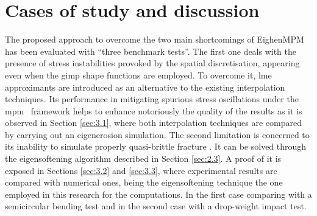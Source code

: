 \documentclass[preprint,12pt,a4paper]{elsarticle}
\begin{document}
\section{Cases of study and discussion}
\label{sec:3}

The proposed approach to overcome the two main shortcomings of
EighenMPM \cite{Zhang_EE_2020} has been evaluated with ``three
benchmark tests''.
The first one deals with the presence of stress
instabilities provoked by the spatial discretisation, appearing even when the \acrshort{gimp} shape functions are employed. To overcome it, \acrshort{lme}
approximants are introduced as an alternative to the existing interpolation techniques. Its
performance in mitigating spurious stress oscillations under the \acrshort{mpm}~\cite{Wobbes2020,Molinos2020} framework helps to enhance
notoriously the quality of the results as it is observed in Section
\ref{sec:3.1}, where both interpolation techniques
are compared by carrying out an eigenerosion simulation. The second
limitation is concerned to its inability to simulate properly quasi-brittle
fracture \cite{Navas_2018_ES}. It can be solved through the
eigensoftening algorithm described in Section \ref{sec:2.3}. A proof
of it is exposed in Sections \ref{sec:3.2} and \ref{sec:3.3}, where experimental results
are compared with numerical ones, being the eigensoftening technique the one employed in this research for the
computations. In the first case comparing with a semicircular bending
test and in the second case with a drop-weight impact test.
\end{document}
